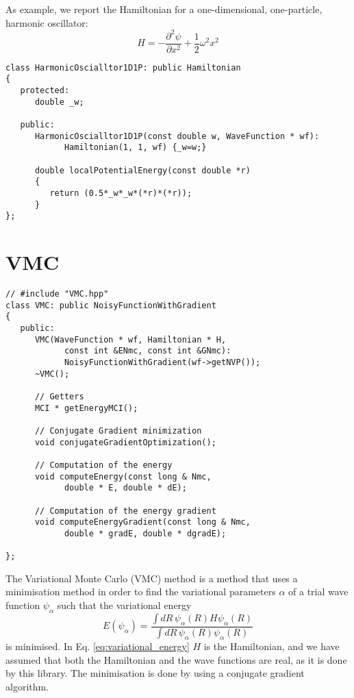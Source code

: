 \documentclass[11pt,a4paper,twoside]{article}
\begin{document}
As example, we report the Hamiltonian for a one-dimensional, one-particle, harmonic oscillator:
\begin{equation}
   H = - \frac{\partial^2 \psi}{\partial x^2} + \frac{1}{2} \omega^2 x^2
\end{equation}

\begin{lstlisting}
class HarmonicOscialltor1D1P: public Hamiltonian
{
   protected:
      double _w;
      
   public:
      HarmonicOscialltor1D1P(const double w, WaveFunction * wf): 
            Hamiltonian(1, 1, wf) {_w=w;}
            
      double localPotentialEnergy(const double *r)
      {
         return (0.5*_w*_w*(*r)*(*r));
      }
};
\end{lstlisting}




\section{VMC} %
\label{sec:vmc}

\begin{lstlisting}
// #include "VMC.hpp"
class VMC: public NoisyFunctionWithGradient
{
   public:
      VMC(WaveFunction * wf, Hamiltonian * H, 
            const int &ENmc, const int &GNmc): 
            NoisyFunctionWithGradient(wf->getNVP());
      ~VMC();

      // Getters
      MCI * getEnergyMCI();

      // Conjugate Gradient minimization
      void conjugateGradientOptimization();

      // Computation of the energy
      void computeEnergy(const long & Nmc, 
            double * E, double * dE);

      // Computation of the energy gradient
      void computeEnergyGradient(const long & Nmc, 
            double * gradE, double * dgradE);

};
\end{lstlisting}

The Variational Monte Carlo (VMC) method is a method that uses a minimisation method in order to find the variational parameters $\alpha$ of a trial wave function $\psi_{\alpha}$ such that the variational energy
\begin{equation}
   E(\psi_{\alpha}) = \frac{\int dR \, \psi_{\alpha}(R) H \psi_{\alpha}(R)}{\int dR \, \psi_{\alpha}(R) \psi_{\alpha}(R)}  \label{eq:variational_energy}
\end{equation}
is minimised.
In Eq. \eqref{eq:variational_energy} $H$ is the Hamiltonian, and we have assumed that both the Hamiltonian and the wave functions are real, as it is done by this library.
The minimisation is done by using a conjugate gradient algorithm.
\end{document}
